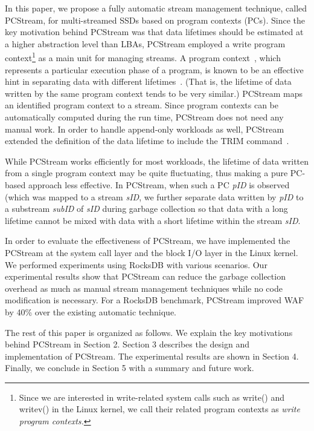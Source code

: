 In this paper, we propose a fully automatic stream management technique, called {\sf PCStream}, 
for multi-streamed SSDs based on program contexts (PCs).
Since the key motivation behind {\sf PCStream} was 
that data lifetimes should be estimated at a higher abstraction level than LBAs, 
{\sf PCStream} employed a write program context\footnote{Since we are interested in write-related 
system calls such as write() and writev() in the Linux kernel, 
we call their related program contexts as {\it write program contexts.}}  
as a main unit for managing streams.   
A program context~\cite{PC}, which represents a particular execution phase of a program, 
is known to be an effective hint in separating data with different lifetimes~\cite{PCHa}.  
(That is, the lifetime of data written by the same program context tends to be very similar.)   
PCStream maps an identified program context to a stream.  
Since program contexts can be automatically computed during the run time, 
PCStream does not need any manual work.   
In order to handle append-only workloads as well, 
PCStream extended the definition of the data lifetime to include the TRIM command~\cite{TRIM}.

While {\sf PCStream} works efficiently for most workloads, the lifetime of data written from
a single program context may be quite fluctuating, thus making a pure PC-based approach less effective.   
In {\sf PCStream}, 
when such a PC {\it pID} is observed (which was mapped to a stream {\it sID}, 
we further separate data written by {\it pID}
to a substream {\it subID} of {\it sID} during garbage collection 
so that data with a long lifetime cannot be mixed with data with a short lifetime within the stream {\it sID}.

In order to evaluate the effectiveness of PCStream, 
we have implemented the PCStream at the system call layer
and the block I/O layer in the Linux kernel.
We performed experiments using RocksDB with 
various scenarios.
Our experimental results show that {\sf PCStream} can reduce the
garbage collection overhead as much as manual stream
management techniques while no code modification is necessary.
For a RocksDB benchmark, {\sf PCStream} improved WAF by 40\% over 
the existing automatic technique.

The rest of this paper is organized as follows. 
We explain the key motivations behind {\sf PCStream} in Section 2. 
Section 3 describes 
the design and implementation of {\sf PCStream}.
The experimental results are shown in Section 4. 
Finally, we conclude in Section 5 with a summary and future work. 

